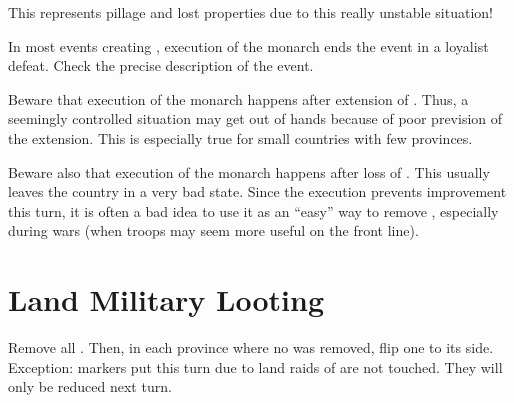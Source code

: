 \begin{designnote}
  This represents pillage and lost properties due to this really unstable
  situation!
\end{designnote}

\bparag In most events creating \REBELLION, execution of the monarch ends the
event in a loyalist defeat. Check the precise description of the event.

\begin{playtip}
  Beware that execution of the monarch happens after extension of
  \REVOLT. Thus, a seemingly controlled situation may get out of hands because
  of poor prevision of the extension. This is especially true for small
  countries with few provinces.

  Beware also that execution of the monarch happens after loss of \STAB. This
  usually leaves the country in a very bad state. Since the execution prevents
  \STAB improvement this turn, it is often a bad idea to use it as an ``easy''
  way to remove \REVOLT, especially during wars (when troops may seem more
  useful on the front line).
\end{playtip}


\section{Land Military Looting}\label{chRedep:Looting}

\bparag Remove all \PILLAGE\Facemoins.
\bparag Then, in each province where no \PILLAGE\Facemoins was removed, flip
one \PILLAGE\Faceplus to its \Facemoins side.
\bparag Exception: \PILLAGE markers put this turn due to land raids of
\corsaire are not touched. They will only be reduced next turn.

